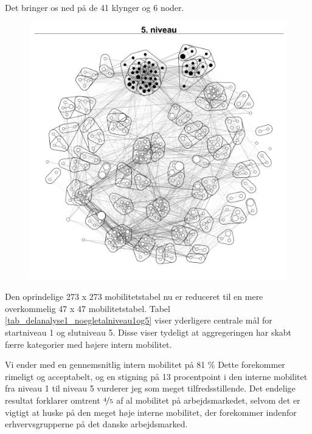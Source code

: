 Det bringer os ned på de 41 klynger og 6 noder.



\begin{figure}[H]
\begin{centering}
  \includegraphics[width=10 cm]{fig/netvaerkskort/kort_seg_proces5.pdf}
  \label{fig_delanalyse1_kort_seg_proces5}
  \caption{}
\end{centering}
\end{figure}







Den oprindelige 273 x 273 mobilitetstabel nu er reduceret til en mere overkommelig 47 x 47 mobilitetstabel. Tabel \ref{tab_delanalyse1_noegletalniveau1og5} viser yderligere centrale mål for startniveau 1 og slutniveau 5. Disse viser tydeligt at aggregeringen har skabt færre kategorier med højere intern mobilitet. 

Vi ender med en gennemsnitlig intern mobilitet på 81 \% Dette forekommer rimeligt og acceptabelt, og en stigning på 13 procentpoint i den interne mobilitet fra niveau 1 til niveau 5 vurderer jeg som meget tilfredsstillende. Det endelige resultat forklarer omtrent $\nicefrac{4}{5}$ af al mobilitet på arbejdsmarkedet, selvom det er vigtigt at huske på den meget høje interne mobilitet, der forekommer indenfor erhvervsgrupperne på det danske arbejdsmarked. 



%

%


